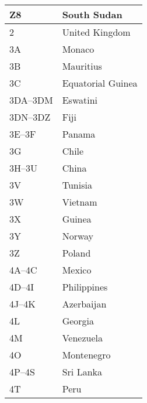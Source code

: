 \begin{longtable}{|l|l|}
  Z8                  & South Sudan                               \\
  \hline
  2                   & United Kingdom                            \\
  \hline
  3A                  & Monaco                                    \\
  \hline
  3B                  & Mauritius                                 \\
  \hline
  3C                  & Equatorial Guinea                         \\
  \hline
  3DA--3DM            & Eswatini                                  \\
  \hline
  3DN--3DZ            & Fiji                                      \\
  \hline
  3E--3F              & Panama                                    \\
  \hline
  3G                  & Chile                                     \\
  \hline
  3H--3U              & China                                     \\
  \hline
  3V                  & Tunisia                                   \\
  \hline
  3W                  & Vietnam                                   \\
  \hline
  3X                  & Guinea                                    \\
  \hline
  3Y                  & Norway                                    \\
  \hline
  3Z                  & Poland                                    \\
  \hline
  4A--4C              & Mexico                                    \\
  \hline
  4D--4I              & Philippines                               \\
  \hline
  4J--4K              & Azerbaijan                                \\
  \hline
  4L                  & Georgia                                   \\
  \hline
  4M                  & Venezuela                                 \\
  \hline
  4O                  & Montenegro                                \\
  \hline
  4P--4S              & Sri Lanka                                 \\
  \hline
  4T                  & Peru                                      \\

\end{longtable}

